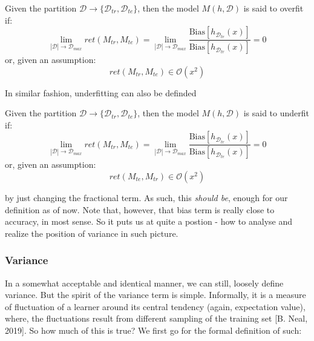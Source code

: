 \begin{definition}
  Given the partition $\mathcal{D}\to \{\mathcal{D}_{tr}, \mathcal{D}_{te}\}$, then the model $M(h, \mathcal{D})$ is said to overfit if: 
  \begin{equation}
    \lim_{|\mathcal{D}|\to \mathcal{D}_{max}} ret(M_{tr}, M_{te}) = \lim_{|\mathcal{D}|\to \mathcal{D}_{max}} \frac{\mathrm{Bias}[h_{\mathcal{D}_{te}}(x)]}{\mathrm{Bias}[h_{\mathcal{D}_{tr}}(x)]} = 0
  \end{equation}
  or, given an assumption: 
  \begin{equation}
    ret(M_{tr}, M_{te}) \in \mathcal{O}(x^2)
  \end{equation}
\end{definition}

In similar fashion, underfitting can also be definded

\begin{definition}
  Given the partition $\mathcal{D}\to \{\mathcal{D}_{tr}, \mathcal{D}_{te}\}$, then the model $M(h, \mathcal{D})$ is said to underfit if: 
  \begin{equation}
    \lim_{|\mathcal{D}|\to \mathcal{D}_{max}} ret(M_{tr}, M_{te}) = \lim_{|\mathcal{D}|\to \mathcal{D}_{max}} \frac{\mathrm{Bias}[h_{\mathcal{D}_{tr}}(x)]}{\mathrm{Bias}[h_{\mathcal{D}_{te}}(x)]} = 0
  \end{equation}
  or, given an assumption: 
  \begin{equation}
    ret(M_{te}, M_{tr}) \in \mathcal{O}(x^2)
  \end{equation}
\end{definition}
by just changing the fractional term. As such, this \textit{should be}, enough for our definition as of now. Note that, however, that bias term is really close to accuracy, in most sense. So it puts us at quite a postion - how to analyse and realize the position of variance in such picture. 

\subsubsection{Variance}

In a somewhat acceptable and identical manner, we can still, loosely define variance. But the spirit of the variance term is simple. Informally, it is a measure of fluctuation of a learner around its central tendency (again, expectation value), where, the fluctuations result from different sampling of the training set [B. Neal, 2019]. So how much of this is true? We first go for the formal definition of such: 

